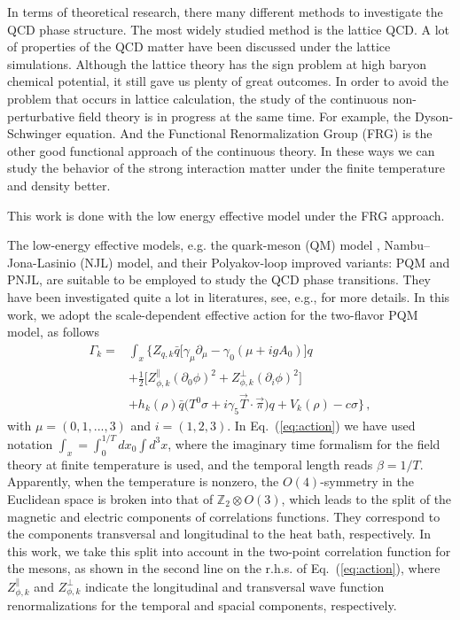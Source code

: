 \documentclass[%
reprint,
superscriptaddress,
showpacs,preprintnumbers,
 amsmath,amssymb,
 aps,
prd,
]{revtex4-1}
\def\Eq#1{Eq.~(\ref{#1})}
\begin{document}
In terms of theoretical research, there many different methods to investigate the QCD phase structure. The most widely studied method is the lattice QCD. A lot of properties of the QCD matter have been discussed under the lattice simulations. Although the lattice theory has the sign problem at high baryon chemical potential, it still gave us plenty of great outcomes. In order to avoid the problem that occurs in lattice calculation, the study of the continuous non-perturbative field theory is in progress at the same time. For example, the Dyson-Schwinger equation. And the Functional Renormalization Group (FRG) is the other good functional approach of the continuous theory. In these ways we can study the behavior of the strong interaction matter under the finite temperature and density better.

This work is done with the low energy effective model under the FRG approach. 



The low-energy effective models, e.g. the quark-meson (QM) model \cite{Schaefer:2004en}, Nambu--Jona-Lasinio (NJL) model, and their Polyakov-loop improved variants: PQM and PNJL, are suitable to be employed to study the QCD phase transitions. They have been investigated quite a lot in literatures, see, e.g., \cite{} for more details. In this work, we adopt the scale-dependent effective action for the two-flavor PQM model, as follows 
\begin{align}
\Gamma_k=&\int_x \bigg\{Z_{q,k}\bar{q} \Big [\gamma_\mu \partial_\mu -\gamma_0(\mu+igA_0) \Big ]q \nonumber\\[2ex]
&+\frac{1}{2}\Big [Z_{\phi,k}^{\parallel}(\partial_0 \phi)^2+Z_{\phi,k}^{\perp}(\partial_i \phi)^2 \Big]\nonumber\\[2ex]
&+h_k(\rho)\bar{q}\big(T^0\sigma+i\gamma_5\vec{T}\cdot \vec{\pi}\big)q+V_k(\rho)-c\sigma \bigg\}\,,\label{eq:action}
\end{align}
with $\mu=(0, 1, ..., 3)$ and $i=(1, 2, 3)$. In \Eq{eq:action} we have used notation $\int_{x}=\int_0^{1/T}d x_0 \int d^3 x$, where the imaginary time formalism for the field theory at finite temperature is used, and the temporal length reads $\beta=1/T$. Apparently, when the temperature is nonzero, the $O(4)$-symmetry in the Euclidean space is broken into that of $\mathbb{Z}_2\otimes O(3)$, which leads to the split of the magnetic and electric components of correlations functions. They correspond to the components transversal and longitudinal to the heat bath, respectively. In this work, we take this split into account in the two-point correlation function for the mesons, as shown in the second line on the r.h.s. of \Eq{eq:action}, where $Z_{\phi,k}^{\parallel}$ and $Z_{\phi,k}^{\perp}$ indicate the longitudinal and transversal wave function renormalizations for the temporal and spacial components, respectively. 
\end{document}
